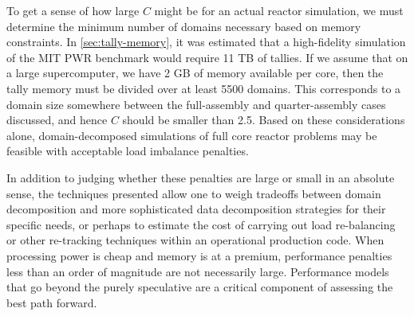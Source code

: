 To get a sense of how large $C$ might be for an actual reactor simulation, we
must determine the minimum number of domains necessary based on memory
constraints. In \autoref{sec:tally-memory}, it was estimated that a
high-fidelity simulation of the MIT PWR benchmark would require 11 TB of
tallies. If we assume that on a large supercomputer, we have 2 GB of memory
available per core, then the tally memory must be divided over at least 5500
domains. This corresponds to a domain size somewhere between the full-assembly
and quarter-assembly cases discussed, and hence $C$ should be smaller than
2.5. Based on these considerations alone, domain-decomposed simulations of full
core reactor problems may be feasible with acceptable load imbalance penalties.

In addition to judging whether these penalties are large or small in an absolute
sense, the techniques presented allow one to weigh tradeoffs between domain
decomposition and more sophisticated data decomposition strategies for their
specific needs, or perhaps to estimate the cost of carrying out load
re-balancing or other re-tracking techniques within an operational production
code. When processing power is cheap and memory is at a premium, performance
penalties less than an order of magnitude are not necessarily large. Performance
models that go beyond the purely speculative are a critical component of
assessing the best path forward.
